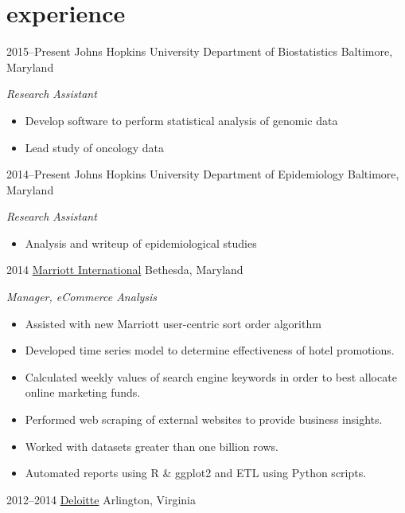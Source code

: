 \documentclass[]{friggeri-cv} %
\begin{document}

\section{experience}

\begin{entrylist}
\entry
{2015--Present}
{Johns Hopkins University Department of Biostatistics}
{Baltimore, Maryland}
{\emph{Research Assistant}
\begin{itemize}
\renewcommand\labelitemi{--}
\item Develop software to perform statistical analysis of genomic data
\item Lead study of oncology data
\end{itemize}
}
\entry
{2014--Present}
{Johns Hopkins University Department of Epidemiology}
{Baltimore, Maryland}
{\emph{Research Assistant}
\begin{itemize}
\renewcommand\labelitemi{--}
\item Analysis and writeup of epidemiological studies
\end{itemize}
}
\entry
{2014}
{\href{http://www.marriott.com/}{Marriott International}}
{Bethesda, Maryland}
{\emph{Manager, eCommerce Analysis}
\begin{itemize}
\renewcommand\labelitemi{--}
\item Assisted with new Marriott user-centric sort order algorithm
\item Developed time series model to determine effectiveness of hotel promotions. 
\item Calculated weekly values of search engine keywords in order to best allocate online marketing funds.
\item Performed web scraping of external websites to provide business insights.
\item Worked with datasets greater than one billion rows.
\item Automated reports using R \& ggplot2 and ETL using Python scripts.
\end{itemize}
}
\entry
{2012--2014}
{\href{http://www.deloitte.com/}{Deloitte}}
{Arlington, Virginia}

\end{entrylist}
\end{document}
